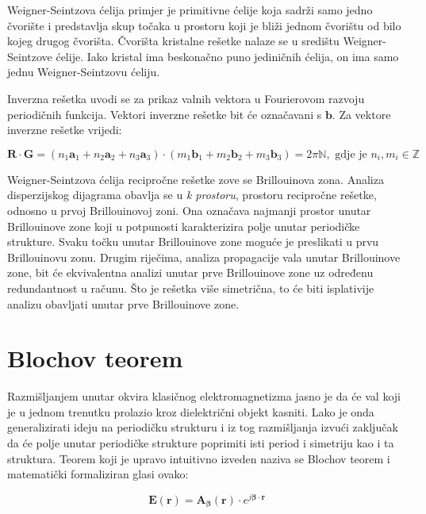 \documentclass[utf8, seminar, numeric]{fer}
\begin{document}
Weigner-Seintzova ćelija primjer je primitivne ćelije koja sadrži samo jedno
čvorište i predstavlja skup točaka u prostoru koji je bliži jednom čvorištu
od bilo kojeg drugog čvorišta. Čvorišta kristalne rešetke nalaze se u središtu
Weigner-Seintzove ćelije. Iako kristal ima beskonačno puno jediničnih ćelija,
on ima samo jednu Weigner-Seintzovu ćeliju.

Inverzna rešetka uvodi se za prikaz valnih vektora u Fourierovom razvoju
periodičnih funkcija. Vektori inverzne rešetke bit će označavani s $\mathbf{b}$.
Za vektore inverzne rešetke vrijedi:

\begin{equation}
	\mathbf{R} \cdot \mathbf{G} =
	(n_1\mathbf{a}_1 + n_2\mathbf{a}_2 + n_3\mathbf{a}_3)
	\cdot
	(m_1\mathbf{b}_1 + m_2\mathbf{b}_2 + m_3\mathbf{b}_3) = 2 \pi \mathbb{N},
		\text{ gdje je }n_i, m_i \in \mathbb{Z}
\end{equation}

Weigner-Seintzova ćelija recipročne rešetke zove se Brillouinova zona. Analiza
disperzijskog dijagrama obavlja se u \textit{k prostoru}, prostoru recipročne
rešetke, odnosno u prvoj Brillouinovoj zoni. Ona označava najmanji
prostor unutar Brillouinove zone koji u potpunosti karakterizira polje unutar
periodičke strukture. Svaku točku unutar Brillouinove zone moguće je preslikati
u prvu Brillouinovu zonu. Drugim riječima, analiza propagacije vala unutar
Brillouinove zone, bit će ekvivalentna analizi unutar prve Brillouinove zone uz
određenu redundantnost u računu. Što je rešetka više simetrična, to će biti
isplativije analizu obavljati unutar prve Brillouinove zone.


\section{Blochov teorem}

Razmišljanjem unutar okvira klasičnog elektromagnetizma jasno je da će val koji
je u jednom trenutku prolazio kroz dielektrični objekt kasniti. Lako je onda
generalizirati ideju na periodičku strukturu i iz tog razmišljanja izvući
zaključak da će polje unutar periodičke strukture poprimiti isti period i
simetriju kao i ta struktura. Teorem koji je upravo intuitivno izveden naziva
se Blochov teorem i matematički formaliziran glasi ovako:

\begin{equation} \label{eq:bloch}
	\mathbf{E}(\mathbf{r}) =
	\mathbf{A}_{\bm{\beta}}(\mathbf{r}) \cdot
		e^{j {\bm{\beta}} \cdot \mathbf{r}}
\end{equation}
\end{document}
